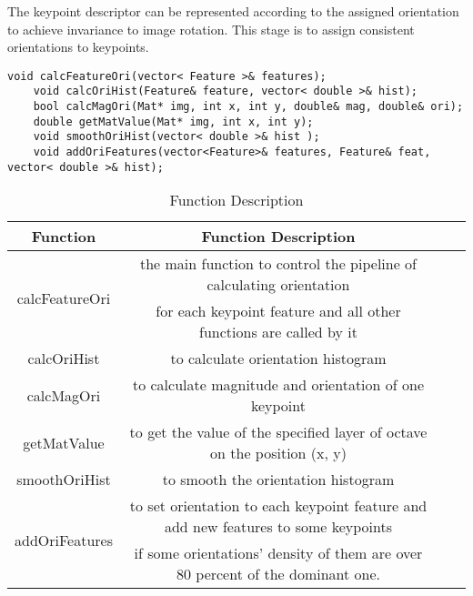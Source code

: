 \documentclass[paper=a4, fontsize=11pt]{scrartcl} %
\numberwithin{equation}{section} %
\numberwithin{figure}{section} %
\numberwithin{table}{section} %
\begin{document}
The keypoint descriptor can be represented according to the assigned orientation to achieve invariance to image rotation. This stage is to assign consistent orientations to keypoints.

\begin{lstlisting}
void calcFeatureOri(vector< Feature >& features);
    void calcOriHist(Feature& feature, vector< double >& hist);
    bool calcMagOri(Mat* img, int x, int y, double& mag, double& ori);
    double getMatValue(Mat* img, int x, int y);
    void smoothOriHist(vector< double >& hist );
    void addOriFeatures(vector<Feature>& features, Feature& feat, vector< double >& hist);
\end{lstlisting}

\begin{table}[h]
    \centering
    \begin{tabular}{|c|c| lp{}}
        \hline
        \textbf{Function} & \textbf{Function Description} \\\hline
\multirow{2}{*}{calcFeatureOri} & the main function to control the pipeline of calculating orientation \\& for each keypoint feature and all other functions are called by it\\\hline
calcOriHist & to calculate orientation histogram\\\hline
calcMagOri & to calculate magnitude and orientation of one keypoint\\\hline
getMatValue & to get the value of the specified layer of octave on the position (x, y)\\\hline
smoothOriHist & to smooth the orientation histogram\\\hline
\multirow{2}{*}{addOriFeatures} & to set orientation to each keypoint feature and add new features to some keypoints  \\& if some orientations' density of them are over 80 percent of the dominant one.\\\hline
    \end{tabular}
    \caption{Function Description}\label{nolock}
\end{table}
\end{document}
